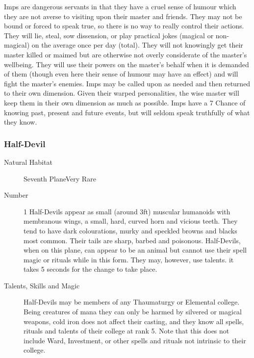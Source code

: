 \begin{multicols}{2}
\begin{description}
\setlength\itemsep{0pt}

\item[Comments]Imps are dangerous servants in that they have a cruel sense
of humour which they are not averse to visiting upon their master and
friends.  They may not be bound or forced to speak true, so there is
no way to really control their actions.  They will lie, steal, sow
dissension, or play practical jokes (magical or non-magical) on the
average once per day (total).  They will not knowingly get their
master killed or maimed but are otherwise not overly considerate of
the master's wellbeing.  They will use their powers on the master's
behalf when it is demanded of them (though even here their sense of
humour may have an effect) and will fight the master's enemies.  Imps
may be called upon as needed and then returned to their own dimension.
Given their warped personalities, the wise master will keep them in
their own dimension as much as possible.  Imps have a 7%
Chance of knowing past, present and future events, but will seldom
speak truthfully of what they know.

\end{description}

\subsubsection{Half-Devil}

\begin{description}
\item[Natural Habitat]Seventh PlaneVery Rare

\item[Number] 1
Half-Devils appear as small (around 3ft) muscular humanoids with
membranous wings, a small, hard, curved horn and vicious teeth.  They
tend to have dark colourations, murky and speckled browns and blacks
most common.  Their tails are sharp, barbed and poisonous.
Half-Devils, when on this plane, can appear to be an animal but cannot
use their spell magic or rituals while in this form.  They may,
however, use talents.  it takes 5 seconds for the change to take
place.

\item[Talents, Skills and Magic]Half-Devils may be members of any Thaumaturgy or Elemental
college.  Being creatures of mana they can only be harmed by silvered
or magical weapons, cold iron does not affect their casting, and they
know all spells, rituals and talents of their college at rank 5.  Note
that this does not include Ward, Investment, or other spells and
rituals not intrinsic to their college.


\end{description}
\end{multicols}
